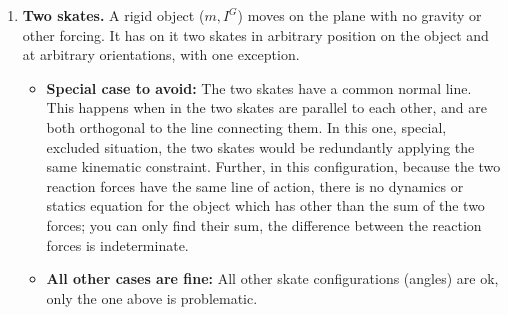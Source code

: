 \documentclass[11pt]{article}
\def\tight{ \setlength{\itemsep}{1.5pt}\setlength{\parskip}{0pt}\setlength{\parsep}{0pt}}
\begin{document}
\begin{enumerate}
\begin{enumerate}\tight

\item Find the equations of motion.

\item Find the needed coefficient of friction to enforce the rolling constraint.

\item After release from rest, assuming it starts with the line between CoM and contact point orthogonal to the surface, how far does it roll before it skips into the air.

\end{enumerate}
It's ok to use numerical solutions based on any non-trivial parameter choices. 
No need for parameter sweeps.
\par
Interesting extension if you have \textit{lots} of time:  With appropriate initial conditions,
this can roll on a level ramp then skip, then do about a full revolution in the air,
then land with no no relative velocity at impact (thus conserving energy) and
continue rolling and skipping. This is explained, somewhat, in a paper on Ruina's
www page: ``A collisional model ...'' (figure 4 there in).  The calculation details are
like those in this paper ``Persistent Passive Hopping ...'' on Ruina's www page. I would love someone to build a model of this.   Talk with me if you are interested.

\item  \textbf{Two skates.} 
A rigid object ($m,I^G$)  moves on the plane with no gravity or other forcing.
It has on it two skates  in arbitrary position on the object and at arbitrary orientations,
with one exception. 

\begin{itemize}
\item \textbf{Special case to avoid:} The two skates have a common normal line.  This happens when in the two skates are parallel to each other, and are both orthogonal to the line connecting them.   In this one, special, excluded situation, the two skates would be redundantly applying the same kinematic constraint.  Further, in this configuration, because the two reaction forces have the same line of action, there is no dynamics or statics equation for the object which has other than the sum of the two forces; you can only find their sum, the difference between the reaction forces is indeterminate.

\item \textbf{All other cases are fine:} All other skate configurations (angles)  are ok, only the one above is problematic. 
\end{itemize}



\end{enumerate}
\end{document}
